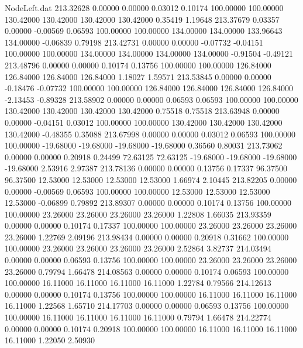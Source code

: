 \begin{filecontents}{NodeLeft.dat}
 213.32628    0.00000    0.00000     0.03012    0.10174  100.00000  100.00000  130.42000  130.42000  130.42000  130.42000    0.35419    1.19648
 213.37679    0.03357    0.00000    -0.00569    0.06593  100.00000  100.00000  134.00000  134.00000  133.96643  134.00000   -0.06839    0.79198
 213.42731    0.00000    0.00000    -0.07732   -0.04151  100.00000  100.00000  134.00000  134.00000  134.00000  134.00000   -0.91504   -0.49121
 213.48796    0.00000    0.00000     0.10174    0.13756  100.00000  100.00000  126.84000  126.84000  126.84000  126.84000    1.18027    1.59571
 213.53845    0.00000    0.00000    -0.18476   -0.07732  100.00000  100.00000  126.84000  126.84000  126.84000  126.84000   -2.13453   -0.89328
 213.58902    0.00000    0.00000     0.06593    0.06593  100.00000  100.00000  130.42000  130.42000  130.42000  130.42000    0.75518    0.75518
 213.63948    0.00000    0.00000    -0.04151    0.03012  100.00000  100.00000  130.42000  130.42000  130.42000  130.42000   -0.48355    0.35088
 213.67998    0.00000    0.00000     0.03012    0.06593  100.00000  100.00000  -19.68000  -19.68000  -19.68000  -19.68000    0.36560    0.80031
 213.73062    0.00000    0.00000     0.20918    0.24499   72.63125   72.63125  -19.68000  -19.68000  -19.68000  -19.68000    2.53916    2.97387
 213.78136    0.00000    0.00000     0.13756    0.17337   96.37500   96.37500   12.53000   12.53000   12.53000   12.53000    1.66974    2.10445
 213.82205    0.00000    0.00000    -0.00569    0.06593  100.00000  100.00000   12.53000   12.53000   12.53000   12.53000   -0.06899    0.79892
 213.89307    0.00000    0.00000     0.10174    0.13756  100.00000  100.00000   23.26000   23.26000   23.26000   23.26000    1.22808    1.66035
 213.93359    0.00000    0.00000     0.10174    0.17337  100.00000  100.00000   23.26000   23.26000   23.26000   23.26000    1.22769    2.09196
 213.98434    0.00000    0.00000     0.20918    0.31662  100.00000  100.00000   23.26000   23.26000   23.26000   23.26000    2.52864    3.82737
 214.03494    0.00000    0.00000     0.06593    0.13756  100.00000  100.00000   23.26000   23.26000   23.26000   23.26000    0.79794    1.66478
 214.08563    0.00000    0.00000     0.10174    0.06593  100.00000  100.00000   16.11000   16.11000   16.11000   16.11000    1.22784    0.79566
 214.12613    0.00000    0.00000     0.10174    0.13756  100.00000  100.00000   16.11000   16.11000   16.11000   16.11000    1.22568    1.65710
 214.17703    0.00000    0.00000     0.06593    0.13756  100.00000  100.00000   16.11000   16.11000   16.11000   16.11000    0.79794    1.66478
 214.22774    0.00000    0.00000     0.10174    0.20918  100.00000  100.00000   16.11000   16.11000   16.11000   16.11000    1.22050    2.50930

\end{filecontents}
